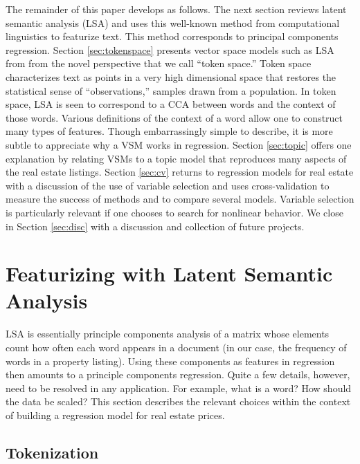 \documentclass[12pt]{article}
\begin{document}
 The remainder of this paper develops as follows.  The next section reviews
 latent semantic analysis (LSA) and uses this well-known method from
 computational linguistics to featurize text.  This method corresponds to
 principal components regression.  Section \ref{sec:tokenspace} presents vector
 space models such as LSA from from the novel perspective that we call ``token
 space.'' Token space characterizes text as points in a very high dimensional
 space that restores the statistical sense of ``observations,'' samples drawn
 from a population.  In token space, LSA is seen to correspond to a CCA between
 words and the context of those words.  Various definitions of the context of a
 word allow one to construct many types of features.  Though embarrassingly
 simple to describe, it is more subtle to appreciate why a VSM works in
 regression.  Section \ref{sec:topic} offers one explanation by relating VSMs to
 a topic model that reproduces many aspects of the real estate listings.
  Section \ref{sec:cv} returns to regression models for real estate with a
 discussion of the use of variable selection and uses cross-validation to
 measure the success of methods and to compare several models.  Variable
 selection is particularly relevant if one chooses to search for nonlinear
 behavior.  We close in Section \ref{sec:disc} with a discussion and collection
 of future projects.



\section{Featurizing with Latent Semantic Analysis}
\label{sec:lsa}

 LSA is essentially principle components analysis
 of a matrix whose elements count how often each word appears in a document (in our
 case, the frequency of words in a property listing).  Using these components as
 features in regression then amounts to a principle components regression.
  Quite a few details, however, need to be resolved in any application. For
 example, what is a word?  How should the data be scaled? 
 This section describes the relevant choices within
 the context of building a regression model for real estate prices.
 
 \subsection{ Tokenization }  %
\end{document}
